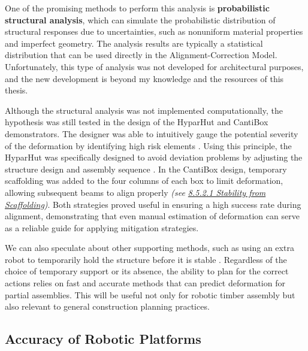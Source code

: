 

One of the promising methods to perform this analysis is \textbf{probabilistic structural analysis}, which can simulate the probabilistic distribution of structural responses due to uncertainties, such as nonuniform material properties and imperfect geometry\parencite{cruseProbabilisticStructuralAnalysis1988, kohlerProbabilisticModelingTimber2007}. The analysis results are typically a statistical distribution that can be used directly in the Alignment-Correction Model. Unfortunately, this type of analysis was not developed for architectural purposes, and the new development is beyond my knowledge and the resources of this thesis. 

Although the structural analysis was not implemented computationally, the hypothesis was still tested in the design of the HyparHut and CantiBox demonstrators. The designer was able to intuitively gauge the potential severity of the deformation by identifying high risk elements . Using this principle, the HyparHut was specifically designed to avoid deviation problems by adjusting the structure design and assembly sequence . In the CantiBox design, temporary scaffolding was added to the four columns of each box to limit deformation, allowing subsequent beams to align properly\textit{ (see \ul{8.5.2.1 Stability from Scaffolding})}. Both strategies proved useful in ensuring a high success rate during alignment, demonstrating that even manual estimation of deformation can serve as a reliable guide for applying mitigation strategies. 

We can also speculate about other supporting methods, such as using an extra robot to temporarily hold the structure before it is stable \parencite{paraschoCooperativeRoboticAssembly2019, thomaRoboticFabricationBespoke2018}. Regardless of the choice of temporary support or its absence, the ability to plan for the correct actions relies on fast and accurate methods that can predict deformation for partial assemblies. This will be useful not only for robotic timber assembly but also relevant to general construction planning practices.

\subsection{Accuracy of Robotic Platforms}
\label{subsection:new-hypo-accuracy-of-robotic-platforms}


